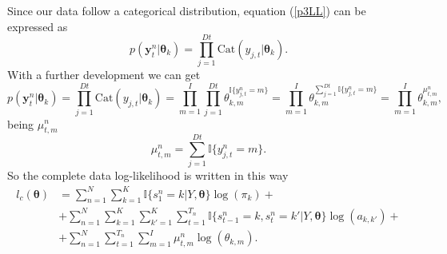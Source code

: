 \documentclass[12pt]{article}%
\newcommand{\indicator}{\mathbb{I}}
\begin{document}
\noindent Since our data follow a categorical distribution, equation (\ref{p3LL}) can be expressed as
\begin{equation}
p \left( \mathbf { y } _ { t } ^ { n } | \boldsymbol\theta_{k} \right) = \prod\limits_{j=1}^{Dt} \text{Cat}(y_{j,t}|\boldsymbol\theta_{k}).
\end{equation}
With a further development we can get
\begin{equation}
p \left( \mathbf { y } _ { t } ^ { n } | \boldsymbol\theta_{k} \right) = \prod\limits_{j=1}^{Dt} \text{Cat}(y_{j,t}|\boldsymbol\theta_{k}) = \prod\limits_{m=1}^{I}\prod\limits_{j=1}^{Dt}\theta_{k,m}^{\indicator\lbrace{y_{j,t}^{n}=m}\rbrace} = \prod\limits_{m=1}^{I}\theta_{k,m}^{\sum\limits_{j=1}^{Dt}\indicator\lbrace{y_{j,t}^{n}=m}\rbrace} = \prod\limits_{m=1}^{I}\theta_{k,m}^{\mu^{n}_{t,m}},
\end{equation}
being $\mu^{n}_{t,m}$
\begin{equation}
\mu^{n}_{t,m} = \sum\limits_{j=1}^{Dt}\indicator\lbrace{y_{j,t}^{n}=m}\rbrace.
\end{equation}
So the complete data log-likelihood is written in this way
\begin{equation}
\begin{split}
l_{c}\left(\boldsymbol\theta\right) &= \sum\limits_{n=1}^{N}\sum\limits_{k=1}^{K}\indicator \lbrace s_{1}^{n}=k|Y,\boldsymbol\theta\rbrace \log(\pi_{k}) + \\
&+ \sum\limits_{n=1}^{N}\sum\limits_{k=1}^{K}\sum\limits_{k'=1}^{K}\sum\limits_{t=1}^{T_{n}}\indicator \lbrace s_{t-1}^{n}=k,s_{t}^{n}=k'|Y,\boldsymbol\theta\rbrace \log(a_{k,k'}) + \\
&+ \sum\limits_{n=1}^{N}\sum\limits_{t=1}^{T_{n}}\sum\limits_{m=1}^{I}\mu^{n}_{t,m} \log(\theta_{k,m}).
\end{split}
\end{equation}
\end{document}
